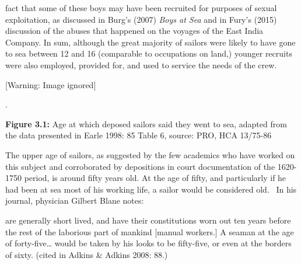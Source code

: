 \begin{styleStandard}
fact that some of these boys may have been recruited for purposes of sexual exploitation, as discussed in Burg’s (2007) \textit{Boys at Sea} and in Fury’s (2015) discussion of the abuses that happened on the voyages of the East India Company. In sum, although the great majority of sailors were likely to have gone to sea between 12 and 16 (comparable to occupations on land,) younger recruits were also employed, provided for, and used to service the needs of the crew.
\end{styleStandard}

\begin{center}
 [Warning: Image ignored] %

\end{center}
\begin{styleStandard}
.
\end{styleStandard}

\begin{styleStandard}
\textbf{Figure 3.1:} Age at which deposed sailors said they went to sea, adapted from the data presented in Earle 1998: 85 Table 6, source: PRO, HCA 13/75-86
\end{styleStandard}

\begin{styleStandard}
The upper age of sailors, as suggested by the few academics who have worked on this subject and corroborated by depositions in court documentation of the 1620-1750 period, is around fifty years old. At the age of fifty, and particularly if he had been at sea most of his working life, a sailor would be considered old. \ In his journal, physician Gilbert Blane notes:
\end{styleStandard}

\begin{styleStandard}
[seamen] are generally short lived, and have their constitutions worn out ten years before the rest of the laborious part of mankind [manual workers.] A seaman at the age of forty-five… would be taken by his looks to be fifty-five, or even at the borders of sixty. (cited in Adkins \& Adkins 2008: 88.) 
\end{styleStandard}

